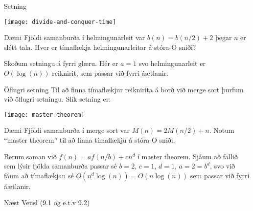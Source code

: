 \documentclass[handout]{beamer}
\begin{document}
\begin{frame}{Setning}
\begin{center}
\texttt{[image: divide-and-conquer-time]}
\end{center}
\end{frame}

\begin{frame}{Dæmi}
Fjöldi samanburða í helmingunarleit var $b(n) = b(n/2) + 2$ þegar $n$ er slétt tala. Hver er tímaflækja helmingunarleitar á stóra-O sniði? \pause

\vspace{1cm}
Skoðum setningu á fyrri glæru. Hér er $a=1$ svo helmingunarleit er $O(\log(n))$ reiknirit, sem passar við fyrri áætlanir.
\end{frame}

\begin{frame}{Öflugri setning}
Til að finna tímaflækjur reiknirita á borð við merge sort þurfum við öflugri setningu. Slík setning er:

\begin{center}
\texttt{[image: master-theorem]}
\end{center}
\end{frame}

\begin{frame}{Dæmi}
Fjöldi samanburða í merge sort var $M(n) = 2M(n/2) + n$. Notum ``master theorem'' til að finna tímaflækju á stóra-O sniði.

\vspace{1cm}
Berum saman við $f(n) = af(n/b) + cn^d$ í master theorem. Sjáum að fallið sem lýsir fjölda samanburða passar sé $b=2$, $c=1$, $d=1$, $a=2=b^d$, svo við fáum að tímaflækjan sé $O(n^d\log (n)) = O(n\log(n))$ sem passar við fyrri áætlanir.
\end{frame}

\begin{frame}{Næst}
Vensl (9.1 og e.t.v 9.2)
\end{frame}
\end{document}
